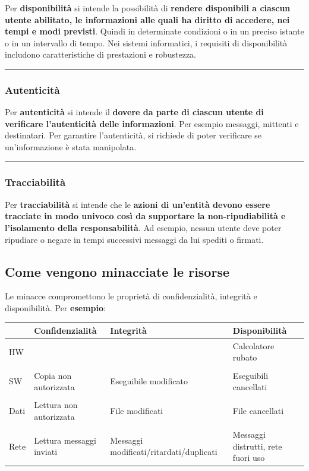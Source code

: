 \documentclass[a4paper]{article}
\newcommand{\longline}{\noindent\rule{\textwidth}{0.4pt}}
\begin{document}
	Per \textcolor{Red3}{\textbf{disponibilità}} si intende la possibilità di \textbf{rendere disponibili a ciascun utente abilitato, le informazioni alle quali ha diritto di accedere, nei tempi e modi previsti}. Quindi in determinate condizioni o in un preciso istante o in un intervallo di tempo. Nei sistemi informatici, i requisiti di disponibilità includono caratteristiche di prestazioni e robustezza.
	
	\longline
	
	\subsubsection{Autenticità}
	
	Per \textcolor{Red3}{\textbf{autenticità}} si intende il \textbf{dovere da parte di ciascun utente di verificare l'autenticità delle informazioni}. Per esempio messaggi, mittenti e destinatari. Per garantire l'autenticità, si richiede di poter verificare se un'informazione è stata manipolata.
	
	\longline
	
	\subsubsection{Tracciabilità}
	
	Per \textcolor{Red3}{\textbf{tracciabilità}} si intende che le \textbf{azioni di un'entità devono essere tracciate in modo univoco così da supportare la non-ripudiabilità e l'isolamento della responsabilità}. Ad esempio, nessun utente deve poter ripudiare o negare in tempi successivi messaggi da lui spediti o firmati.\newpage
	
	\subsection{Come vengono minacciate le risorse} \label{come vengono minacciate le risorse}
	
	Le minacce compromettono le proprietà di confidenzialità, integrità e disponibilità. Per \textcolor{Green4}{\textbf{esempio}}:
	
	\begin{table}[!htp]
		\centering
		\begin{tabular}{@{} l p{9em} p{9em} p{9em} @{}}
			\toprule
			& Confidenzialità & Integrità & Disponibilità \\
			\midrule
			HW & & & Calcolatore rubato \\
			&&&\\
			SW & Copia non autorizzata & Eseguibile modificato & Eseguibili cancellati \\
			&&&\\
			Dati & Lettura non autorizzata & File modificati & File cancellati \\
			&&&\\
			Rete & Lettura messaggi inviati & Messaggi modificati/ritardati/duplicati & Messaggi distrutti, rete fuori uso \\
			\bottomrule
		\end{tabular}
	\end{table}
	
\end{document}

